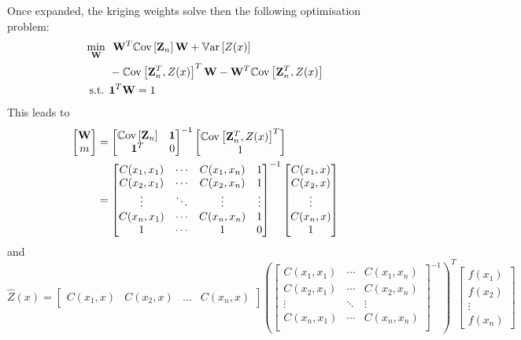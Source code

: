 \documentclass[../../Main_ManuscritThese.tex]{subfiles}
\begin{document}
Once expanded, the kriging weights solve then the following optimisation problem:
\begin{align}
  \min_{\mathbf{W}} ~&~\mathbf{W}^T \mathbb{C}\mathrm{ov}\left[\mathbf{Z}_n\right] \mathbf{W}+ \mathbb{V}\mathrm{ar}\left[Z(x)\right] \\ &-\mathbb{C}\mathrm{ov}\left[\mathbf{Z}_n^T, Z(x) \right]^T \mathbf{W}- \mathbf{W}^T\mathbb{C}\mathrm{ov}\left[\mathbf{Z}_n^T, Z(x) \right] \\ 
  \text{s.t. }&  \mathbf{1}^T\mathbf{W} = 1
\end{align}
This leads to
\begin{align}
  \begin{bmatrix}
    \mathbf{W} \\ m
  \end{bmatrix}
  &=
  \begin{bmatrix}
    \mathbb{C}\mathrm{ov}\left[\mathbf{Z}_n\right] & \mathbf{1} \\
  \mathbf{1}^T & 0
\end{bmatrix}^{-1}
                 \begin{bmatrix}
                  \mathbb{C}\mathrm{ov}\left[\mathbf{Z}_n^T, Z(x) \right]^T \\ 1 
\end{bmatrix}
  \\ &=
    \begin{bmatrix}
      C(x_1, x_1) & \cdots & C(x_1, x_n) & 1 \\
      C(x_2, x_1) & \cdots & C(x_2, x_n) & 1 \\
      \vdots & \ddots & \vdots & \vdots \\
      C(x_n, x_1) & \cdots & C(x_n, x_n)& 1 \\
      1 & \cdots & 1 & 0
    \end{bmatrix}^{-1}
                       \begin{bmatrix}
                         C(x_1, x) \\
                         C(x_2, x) \\
                         \vdots \\
                         C(x_n, x) \\
                         1
                       \end{bmatrix}
\end{align}
and
\begin{equation}
  \hat{Z}(x) =
      \begin{bmatrix}
      C(x_1, x) &
      C(x_2, x) &
      \dots &
      C(x_n, x)
      \end{bmatrix}
      \left(\begin{bmatrix} C(x_1, x_1) & \cdots & C(x_1, x_n)\\
      C(x_2, x_1) & \cdots & C(x_2, x_n) \\
      \vdots & \ddots & \vdots  \\
      C(x_n, x_1) & \cdots & C(x_n, x_n) \\
    \end{bmatrix}^{-1}\right)^T
  \begin{bmatrix}
    f(x_1) \\ f(x_2) \\ \vdots \\ f(x_n)
  \end{bmatrix}
\end{equation}
\end{document}
